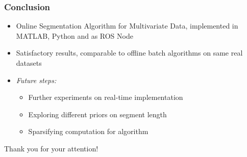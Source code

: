 \documentclass{beamer} %
\begin{document}
\begin{frame}
\frametitle{Conclusion}
\begin{itemize}
\item Online Segmentation Algorithm for Multivariate Data, implemented in MATLAB, Python and as ROS Node
\item Satisfactory results, comparable to offline batch algorithms on same real datasets
\item \textit{Future steps:}
\begin{itemize}
\item Further experiments on real-time implementation
\item Exploring different priors on segment length
\item Sparsifying computation for algorithm 
\end{itemize}
\end{itemize}
\end{frame}

\begin{frame}
\centering
\huge{Thank you for your attention!}
\end{frame}




\end{document}
